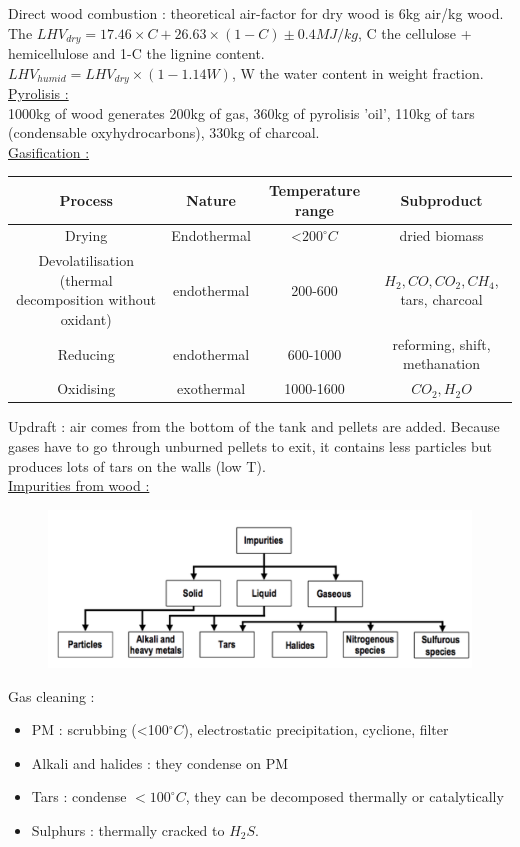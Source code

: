 \documentclass[../main.tex]{subfiles}
\begin{document}
Direct wood combustion : theoretical air-factor for dry wood is 6kg air/kg wood. The $LHV_{dry} = 17.46 \times C + 26.63 \times (1-C) \pm 0.4MJ/kg$, C the cellulose + hemicellulose and 1-C the lignine content. \\
$LHV_{humid} = LHV_{dry} \times (1-1.14W)$, W the water content in weight fraction. \\

\quad \underline{Pyrolisis :}\\
1000kg of wood generates 200kg of gas, 360kg of pyrolisis 'oil', 110kg of tars (condensable oxyhydrocarbons), 330kg of charcoal. \\

\quad \underline{Gasification :}\\
\begin{table}[hbt!]
    \centering
    \begin{tabular}{c|c|c|c}
        Process & Nature & Temperature range & Subproduct \\ \hline
        Drying & Endothermal & <$200^\circ C$ & dried biomass\\
        Devolatilisation (thermal decomposition without oxidant) & endothermal & 200-600 & $H_2, CO, CO_2, CH_4$, tars, charcoal\\
        Reducing & endothermal & 600-1000 & reforming, shift, methanation\\
        Oxidising & exothermal & 1000-1600 & $CO_2, H_2O$
    \end{tabular}
\end{table}

Updraft : air comes from the bottom of the tank and pellets are added. Because gases have to go through unburned pellets to exit, it contains less particles but produces lots of tars on the walls (low T). \\

\quad \underline{Impurities from wood :}\\
\begin{figure}[hbt!]
    \centering
    \includegraphics[width=0.5\linewidth]{IMAGES/Renewable/Screenshot from 2025-04-15 23-24-53.png}
\end{figure}

Gas cleaning : \begin{itemize}
    \item PM : scrubbing (<100$^\circ C$), electrostatic precipitation, cyclione, filter
    \item Alkali and halides : they condense on PM
    \item Tars : condense $<100^\circ C$, they can be decomposed thermally or catalytically
    \item Sulphurs : thermally cracked to $H_2S$.
\end{itemize}
\end{document}
